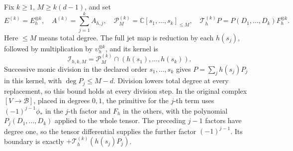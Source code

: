 Fix \(k\ge1\), \(M\ge k(d-1)\), and set
\[
 E^{(k)}=E_h^{\otimes k},\quad A^{(k)}=\sum_{j=1}^kA_{h,j},
 \quad \mathcal P_M^{(k)}=\mathbb C[s_1,\ldots,s_k]_{\le M},
 \quad \mathcal T_h^{(k)}P=P(D_1,\ldots,D_k)F_h^{\otimes k}.
\]
Here \(\le M\) means total degree.  The full jet map is
reduction by each \(h(s_j)\), followed by multiplication by
\(\upsilon_h^{\otimes k}\), and its kernel is
\[
 \mathcal I_{h,k,M}=\mathcal P_M^{(k)}
            \cap(h(s_1),\ldots,h(s_k)).                 \tag{CT.11}
\]
Successive monic division in the declared order
\(s_1,\ldots,s_k\) gives
\(P=\sum_jh(s_j)P_j\) in this kernel, with
\(\deg P_j\le M-d\).  Division lowers total degree at every
replacement, so this bound holds at every division step.  In the
original complex \([V\to\mathscr B]\), placed in degrees
\(0,1\), the primitive for the \(j\)-th term uses
\((-1)^{j-1}\phi_*\) in the \(j\)-th factor and \(F_h\)
in the others, with the polynomial \(P_j(D_1,\ldots,D_k)\)
applied to the whole tensor.  The preceding \(j-1\) factors have
degree one, so the tensor differential supplies the further factor
\((-1)^{j-1}\).  Its boundary is exactly
\(+\mathcal T_h^{(k)}(h(s_j)P_j)\).

